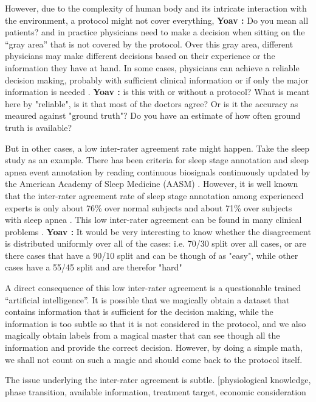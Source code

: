 \documentclass[10pt]{wlscirep}
\newcommand{\comment}[3]{{\color{#1} {\bf #2 :} #3}}
\newcommand{\yoav}[1]{\comment{red}{Yoav}{#1}}
\begin{document}
However, due to the complexity of human body and its intricate interaction with the environment, a protocol might not cover everything,
\yoav{Do you mean all patients?}
and in practice physicians need to make a decision when sitting on the ``gray area'' that is not covered by the protocol. Over this gray area, different physicians may make different decisions based on their experience or the information they have at hand. In some cases, physicians can achieve a reliable decision making, probably with sufficient clinical information \cite{mehta2011agreement} or if only the major information is needed \cite{atiya2003interobserver}. 
\yoav{is this with or without a protocol? What is meant here by "reliable", is it that most of the doctors agree? Or is it the accuracy as meaured against "ground truth"?  Do you have an estimate of how often ground truth is available?}

But in other cases, a low inter-rater agreement rate might happen. Take the sleep study as an example. There has been criteria for sleep stage annotation and sleep apnea event annotation by reading continuous biosignals continuously updated by the American Academy of Sleep Medicine (AASM) \cite{Iber2007,berry2012aasm}. However, it is well known that the inter-rater agreement rate of sleep stage annotation among experienced experts is only about 76\% over normal subjects and about 71\% over subjects with sleep apnea \cite{norman2000interobserver}. This low inter-rater agreement can be found in many clinical problems \cite{brosnan2015modest,venhola2003interobserver,moncada2011reading}. 
\yoav{It would be very interesting to know whether the disagreement is distributed uniformly over all of the cases: i.e. 70/30 split over all cases, or are there cases that have a 90/10 split and can be though of as "easy", while other cases have a 55/45 split and are therefor "hard"}

A direct consequence of this low inter-rater agreement is a questionable trained ``artificial intelligence''. It is possible that we magically obtain a dataset that contains information that is sufficient for the decision making, while the information is too subtle so that it is not considered in the protocol, and we also magically obtain labels from a magical master that can see though all the information and provide the correct decision. However, by doing a simple math, we shall not count on such a magic and should come back to the protocol itself.

The issue underlying the inter-rater agreement is subtle. [physiological knowledge, phase transition, available information, treatment target, economic consideration
\end{document}
